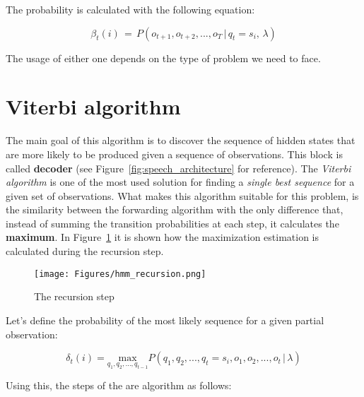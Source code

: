 \noindent The probability is calculated with the following equation:

\begin{equation}
\label{eq:backward_algorithm}
	\beta_{t}(i) \, = \, P(o_{t+1}, o_{t+2}, ... , o_{T} \, | \, q_{t} = s_{i}, \, \lambda)
\end{equation}

\noindent The usage of either one depends on the type of problem we need to face.


\section{Viterbi algorithm}
\label{sec:viterbi}
The main goal of this algorithm is to discover the sequence of hidden states that are more likely to be produced given a sequence of observations. This block is called \textbf{decoder} (see Figure~\ref{fig:speech_architecture} for reference). The \textit{Viterbi algorithm} is one of the most used solution for finding a \textit{single best sequence} for a given set of observations. What makes this algorithm suitable for this problem, is the similarity between the forwarding algorithm with the only difference that, instead of summing the transition probabilities at each step, it calculates the \textbf{maximum}. In Figure~\ref{fig:hmm_recursion} it is shown how the maximization estimation is calculated during the recursion step.

\begin{figure}[!ht]
	\centering
	\texttt{[image: Figures/hmm\_recursion.png]}
	\caption{The recursion step}
	\label{fig:hmm_recursion}
\end{figure}

\noindent Let's define the probability of the most likely sequence for a given partial observation:

\begin{equation}
	\delta_{t}(i) =  \underset{q_{1},q_{2}, ... , q_{t-1}}{\mathrm{max}} P (q_{1},q_{2}, ... , q_{t} = s_{i}, o_{1}, o_{2}, ... , o_{t} \, | \, \lambda)
\end{equation}

\noindent Using this, the steps of the are algorithm as follows:

